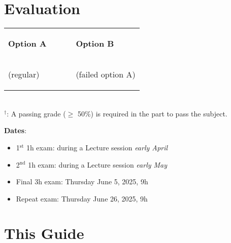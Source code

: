 \section{Evaluation}

\begin{tabular}{p{0.5\linewidth}p{0.5\linewidth}}
\begin{flushleft}\textbf{Option A}\end{flushleft} & \begin{flushright}\textbf{Option B}\end{flushright}\\[-0.75cm]
\begin{flushleft}(regular)\end{flushleft} & \begin{flushright}(failed option A)\end{flushright}\\[-0.5cm]
\end{tabular}
\begin{center}
\quad
{}
\\
$^{\dagger}$: A passing grade ($\ge$ 50\%) is required in the part to pass the subject.\\[0.1cm]
\end{center}

\noindent
\textbf{Dates}:
\begin{itemize}
\item 1$^\textrm{st}$ 1h exam: during a Lecture session \textit{early April}
\item 2$^\textrm{nd}$ 1h exam: during a Lecture session \textit{early May}
\item Final 3h exam: Thursday June 5, 2025, 9h
\item Repeat exam: Thursday June 26, 2025, 9h
\end{itemize}

\newpage

\section{This Guide}

